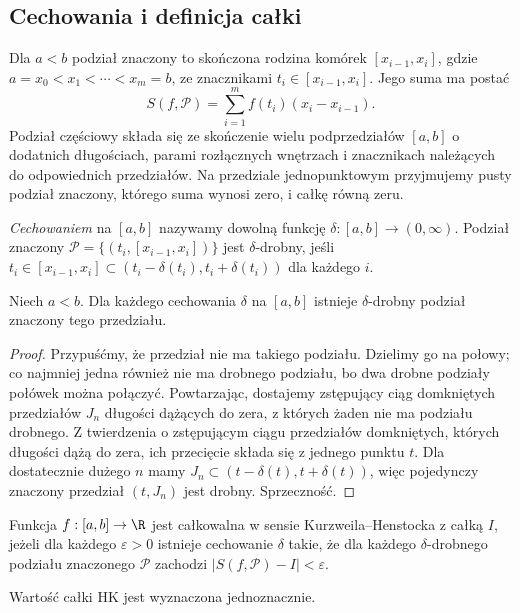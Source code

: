 \subsection{Cechowania i definicja całki}
\begin{definicja}
\label{ma1:kh:def:kh-gauge}\label{it:def:kh-gauge}
Dla $a<b$ podział znaczony to skończona rodzina komórek $[x_{i-1},x_i]$, gdzie $a=x_0<x_1<\cdots<x_m=b$, ze znacznikami $t_i\in[x_{i-1},x_i]$. Jego suma ma postać
\[
 S(f,\mathcal P)=\sum_{i=1}^m f(t_i)(x_i-x_{i-1}).
\]
Podział częściowy składa się ze skończenie wielu podprzedziałów $[a,b]$ o dodatnich długościach, parami rozłącznych wnętrzach i znacznikach należących do odpowiednich przedziałów. Na przedziale jednopunktowym przyjmujemy pusty podział znaczony, którego suma wynosi zero, i całkę równą zeru.


\emph{Cechowaniem} na $[a,b]$ nazywamy dowolną funkcję $\delta:[a,b]\to(0,\infty)$. Podział znaczony $\mathcal P=\{(t_i,[x_{i-1},x_i])\}$ jest $\delta$-drobny, jeśli $t_i\in[x_{i-1},x_i]\subset(t_i-\delta(t_i),t_i+\delta(t_i))$ dla każdego $i$.
\end{definicja}
\begin{lemat}[Cousina]\label{ma1:kh:lem:kh-cousin}\label{it:lem:kh-cousin}
Niech $a<b$. Dla każdego cechowania $\delta$ na $[a,b]$ istnieje $\delta$-drobny podział znaczony tego przedziału.
\end{lemat}
\begin{proof}
Przypuśćmy, że przedział nie ma takiego podziału. Dzielimy go na połowy; co najmniej jedna również nie ma drobnego podziału, bo dwa drobne podziały połówek można połączyć. Powtarzając, dostajemy zstępujący ciąg domkniętych przedziałów $J_n$ długości dążących do zera, z których żaden nie ma podziału drobnego. Z twierdzenia o zstępującym ciągu przedziałów domkniętych, których długości dążą do zera, ich przecięcie składa się z jednego punktu $t$. Dla dostatecznie dużego $n$ mamy $J_n\subset(t-\delta(t),t+\delta(t))$, więc pojedynczy znaczony przedział $(t,J_n)$ jest drobny. Sprzeczność.
\end{proof}
\begin{definicja}
\label{ma1:kh:def:kh-integral}\label{it:def:kh-integral}
Funkcja $f:[a,b]\to\R$ jest całkowalna w sensie Kurzweila--Henstocka z całką $I$, jeżeli dla każdego $\varepsilon>0$ istnieje cechowanie $\delta$ takie, że dla każdego $\delta$-drobnego podziału znaczonego $\mathcal P$ zachodzi $|S(f,\mathcal P)-I|<\varepsilon$.
\end{definicja}
\begin{stwierdzenie}[Jednoznaczność]
\label{ma1:kh:prop:kh-unique}\label{it:prop:kh-unique}
Wartość całki HK jest wyznaczona jednoznacznie.
\end{stwierdzenie}
